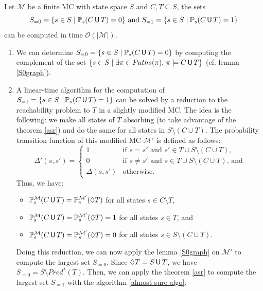 \begin{corollary}\label{qualitative-const-reach} Let $\mathcal{M}$ be a finite MC with state space $S$ and $C, T \subseteq S$, the sets
\[
  S_{=0} = \{ s \in S \; | \; \mathbb{P}_s (C \,\text{\sffamily U}\, T) = 0 \} \text{ and } S_{=1} = \{ s \in S \; | \; \mathbb{P}_s (C \,\text{\sffamily U}\, T ) = 1 \}
  \]
  can be computed in time $\mathcal{O}(|\mathcal{M}|)$.
\end{corollary}
\begin{proof2}\cite{PMC}
\begin{enumerate}
  \item We can determine $S_{=0}=\{s \in S \; | \; \mathbb{P}_s(C \,\text{\sffamily U}\, T)=0\}$ by computing the complement of the set $\{s \in S \; | \; \exists \pi \in Paths(\pi), \, \pi \models C \,\text{\sffamily U}\, T \}$ (cf. lemma \ref{S0graph}).
  \item A linear-time algorithm for the computation of $S_{=1}=\{ s\in S \; | \; \mathbb{P}_s(C \,\text{\sffamily U}\, T) = 1 \}$ can be solved by a reduction to the reachability problem to $T$ in a slightly modified MC. The idea is the following: we make all states of $T$ absorbing (to take advantage of the theorem \ref{asr}) and do the same for all states in $S \setminus (C \cup T)$.
  The probability transition function of this modified MC $\mathcal{M}'$ is
  defined as follows:
  \[
    \Delta'(s, s') = \begin{cases}
      1 & \text{if } s=s' \text{ and } s'\in T \cup S \setminus(C \cup T),\\
      0 & \text{if } s \neq s' \text{ and } s \in T \cup S \setminus (C \cup T),\, \text{and}\\
      \Delta(s, s') & \text{otherwise}.
    \end{cases}
  \]
  Thus, we have:
  \begin{itemize}
    \item $\mathbb{P}_s^\mathcal{M}(C \,\text{\sffamily U}\, T) = \mathbb{P}_s^\mathcal{M'}(\Diamond T)$ for all states $s \in C \setminus T$,
    \item $\mathbb{P}_s^\mathcal{M}(C \,\text{\sffamily U}\, T) = \mathbb{P}_s^{\mathcal{M}'}(\Diamond T) = 1$
    for all states $s \in T$, and
    \item $\mathbb{P}_s^\mathcal{M}(C \,\text{\sffamily U}\, T)= \mathbb{P}_s^{\mathcal{M}'}(\Diamond T) = 0$ for all states $s \in S \setminus (C \cup T)$.
  \end{itemize}
  Doing this reduction, we can now apply the lemma \ref{S0graph} on $\mathcal{M}'$ to compute the largest set $S_{=0}$. Since $\Diamond T = S \,\text{\sffamily U}\, T$, we have $S_{=0}= S \setminus Pred^*(T)$. Then, we can apply the theorem  \ref{asr} to compute the largest set $S_{=1}$ with the algorithm \ref{almost-sure-algo}.
\end{enumerate}
\end{proof2}\\

